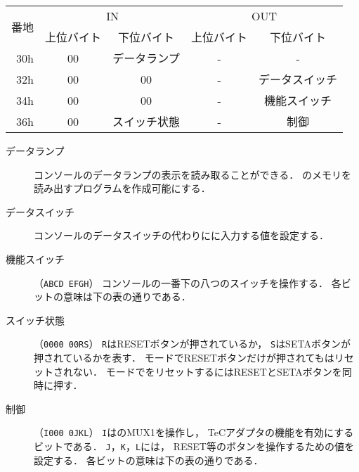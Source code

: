 \begin{center}
  \small\begin{tabular}{| r | c | c || c | c |}\hline
    \multirow{2}{*}{番地}
    & \multicolumn{2}{|c||}{IN}
    & \multicolumn{2}{c|}{OUT}
    \\\cline{2-5}
         & 上位バイト & 下位バイト & 上位バイト & 下位バイト
    \\\hline\hline
    30h  &  00 & データランプ
         &  -  & -              \\\hline
    32h  &  00 & 00
         &  -  & データスイッチ \\\hline
    34h  &  00 & 00
         &  -  & 機能スイッチ   \\\hline
    36h  &  00 & スイッチ状態
         &  -  & 制御           \\\hline
  \end{tabular}
\end{center}

\begin{description}
\item[データランプ]
  {\tec}コンソールのデータランプの表示を読み取ることができる．
  {\tec}のメモリを読み出す{\tac}プログラムを作成可能にする．
\item[データスイッチ]
  コンソールのデータスイッチの代わりに{\tec}に入力する値を設定する．
\item[機能スイッチ]（\texttt{ABCD EFGH}）
  {\tec}コンソールの一番下の八つのスイッチを操作する．
  各ビットの意味は下の表の通りである．
\item[スイッチ状態]（\texttt{0000 00RS}）
  \texttt{R}はRESETボタンが押されているか，
  \texttt{S}はSETAボタンが押されているかを表す．
  {\tec}モードでRESETボタンだけが押されても{\tac}はリセットされない．
  {\tec}モードで{\tac}をリセットするにはRESETとSETAボタンを同時に押す．
\item[制御]（\texttt{I000 0JKL}）
  \texttt{I}はのMUX1を操作し，
  TeCアダプタの機能を有効にするビットである．
  \texttt{J}，\texttt{K}，\texttt{L}には，
  RESET等のボタンを操作するための値を設定する．
  各ビットの意味は下の表の通りである．
\end{description}

